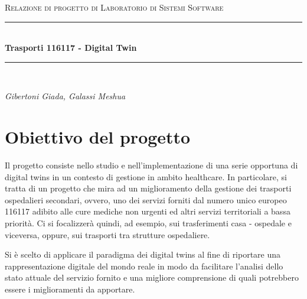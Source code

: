 \documentclass[12pt]{article}
\begin{document}

\begin{titlepage}

\newcommand{\HRule}{\rule{\linewidth}{0.5mm}}
\center

\textsc{\Large Relazione di progetto di Laboratorio di Sistemi Software}\\[0.5cm]

\HRule \\[0.4cm]
{ \huge \bfseries Trasporti 116117 - Digital Twin}\\[0.4cm]
\HRule \\[1.5cm]

\vfill

\begin{flushleft}
\emph{Gibertoni Giada, Galassi Meshua}\\[3cm]

\end{flushleft}



\end{titlepage}


\tableofcontents

\newpage

\section{Obiettivo del progetto}
Il progetto consiste nello studio e nell'implementazione di una serie opportuna di digital twins in un contesto di gestione in ambito healthcare.
In particolare, si tratta di un progetto che mira ad un miglioramento della gestione dei trasporti ospedalieri secondari, ovvero, uno dei servizi forniti dal numero unico europeo 116117 adibito alle cure mediche non urgenti ed altri servizi territoriali a bassa priorità.
Ci si focalizzerà quindi, ad esempio, sui trasferimenti casa - ospedale e viceversa, oppure, sui trasporti tra strutture ospedaliere.

Si è scelto di applicare il paradigma dei digital twins al fine di riportare una rappresentazione digitale del mondo reale in modo da facilitare l'analisi dello stato attuale del servizio fornito e una migliore comprensione di quali potrebbero essere i miglioramenti da apportare. 
\end{document}
